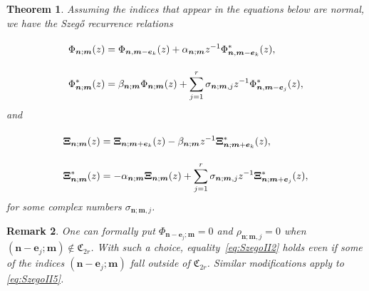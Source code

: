 \documentclass[reqno,centertags,11pt,draft]{amsart}
\newtheorem{thm}{Theorem}[section]
\newtheorem{rem}[thm]{Remark}
\begin{document}
\begin{thm}\label{thm:Szego2}
Assuming the indices that appear in the equations below are normal, we have the Szeg\H{o} recurrence relations 
\begin{align}
         \label{eq:SzegoII4}
        \vphantom{\sum_{j = 1}^{r}} 
        & \Phi_{\bm{n};\bm{m}}(z) = \Phi_{\bm{n},\bm{m}-\bm{e}_k}(z) + \alpha_{\bm{n};\bm{m}}z^{-1}\Phi^*_{\bm{n},\bm{m}-\bm{e}_k}(z), 
        \\ \label{eq:SzegoII5}
        & \Phi^*_{\bm{n};\bm{m}}(z) = \beta_{\bm{n};\bm{m}}\Phi_{\bm{n};\bm{m}}(z) + \sum_{j = 1}^r \sigma_{\bm{n};\bm{m},j}z^{-1} \Phi_{\bm{n},\bm{m}-\bm{e}_j}^*(z), 
    \end{align}
    and
    \begin{align}
        \label{eq:SzegoI4}
        & \vphantom{\sum_{j = 1}^{r}} 
        \bm{\Xi}_{\bm{n};\bm{m}}(z) = \bm{\Xi}_{\bm{n};\bm{m}+\bm{e}_k}(z) -\beta_{\bm{n};\bm{m}}z^{-1} \bm{\Xi}^*_{\bm{n};\bm{m}+\bm{e}_k}(z),
        \\
        \label{eq:SzegoI5}
        & \bm{{\Xi}}^*_{\bm{n};\bm{m}}(z) = -\alpha_{\bm{n};\bm{m}}\bm{\Xi}_{\bm{n};\bm{m}}(z) + \sum_{j = 1}^{r}\sigma_{\bm{n};\bm{m},j}z^{-1} \bm{\Xi}^*_{\bm{n};\bm{m}+\bm{e}_j}(z),
\end{align}
for some complex numbers $\sigma_{\bm{n};\bm{m},j}$.
\end{thm}
\begin{rem}
     One can formally put $\Phi_{\bm{n}-\bm{e}_j;\bm{m}} = 0$ and $\rho_{\bm{n};\bm{m},j} = 0$ when $(\bm{n}-\bm{e}_j;\bm{m})\notin \mathfrak{C}_{2r}$. With such a choice, equality~\eqref{eq:SzegoII2} 
     holds even if some of the indices $(\bm{n}-\bm{e}_j;\bm{m})$ 
     fall outside of $\mathfrak{C}_{2r}$. Similar modifications apply to \eqref{eq:SzegoII5}. %
\end{rem}
\end{document}
